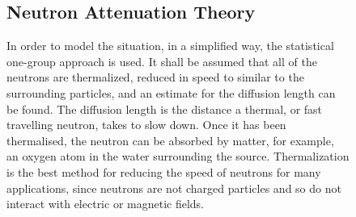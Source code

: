 \begin{figure}[ht]
\subsection{Neutron Attenuation Theory} %
\label{sub:neutron_attenuation_theory}
In order to model the situation, in a simplified way, the statistical one-group approach is used. It shall be assumed that all of the neutrons are thermalized, reduced in speed to similar to the surrounding particles, and an estimate for the diffusion length can be found. The diffusion length is the distance a thermal, or fast travelling neutron, takes to slow down. Once it has been thermalised, the neutron can be absorbed by matter, for example, an oxygen atom in the water surrounding the source. Thermalization is the best method for reducing the speed of neutrons for many applications, since neutrons are not charged particles and so do not interact with electric or magnetic fields.


\end{figure}
